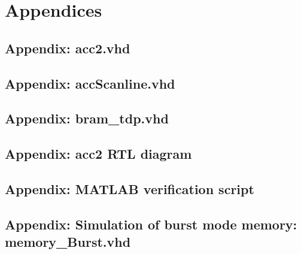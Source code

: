 \appendix
\renewcommand{\thesection}{\Alph{section}}
\newpage
\section{Appendices}

\subsection{Appendix: acc2.vhd}
\label{app:acc2}		


\newpage
\subsection{Appendix: accScanline.vhd}
\label{app:accScanline}		


\newpage
\subsection{Appendix: bram\_tdp.vhd}
\label{app:bram}	


\newpage
\subsection{Appendix: acc2 RTL diagram}
\label{app:accBlockDiagram}


\newpage
\subsection{Appendix: MATLAB verification script}
\label{app:Matlab}
\lstset{language=Matlab} 


\newpage
\subsection{Appendix: Simulation of burst mode memory: memory\_Burst.vhd }
\label{app:MemBurst}
\lstset{language=VHDL} 
